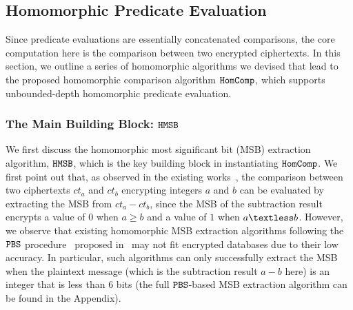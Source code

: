 \subsection{Homomorphic Predicate Evaluation}\label{block: comparison}
Since predicate evaluations are essentially concatenated comparisons,
the core computation here
is the comparison between two encrypted ciphertexts.
In this section,  we outline a series of homomorphic algorithms we devised
that lead to the proposed homomorphic comparison algorithm 
$\texttt{HomComp}$, which supports unbounded-depth homomorphic predicate evaluation. %

\subsubsection{The Main Building Block: $\texttt{HMSB}$}
We first discuss the homomorphic most significant bit (MSB) extraction algorithm, $\texttt{HMSB}$, 
which is the key building block in instantiating $\texttt{HomComp}$.
We first point out that, as observed in the existing works~\cite{heda, pegasus,largeprecision}, 
the comparison between two ciphertexts $ct_a$ and $ct_b$ encrypting integers $a$ and $b$
can be evaluated by extracting the MSB from $ct_a-ct_b$,
since the MSB of the subtraction result encrypts a value of $0$ when $a \geq b$ and 
a value of $1$ when $a \textless b$. 
However, we observe that existing homomorphic MSB extraction algorithms following the $\texttt{PBS}$ 
procedure~\cite{pegasus} proposed  in~\cite{DBLP:conf/asiacrypt/tfhepbs}
may not fit encrypted databases due to their low accuracy. In particular, such algorithms
can only successfully extract the MSB when the plaintext message (which is the
subtraction result $a-b$ here)
is an integer that is less than 6 bits (the full $\texttt{PBS}$-based MSB extraction algorithm can be
found in the Appendix).

